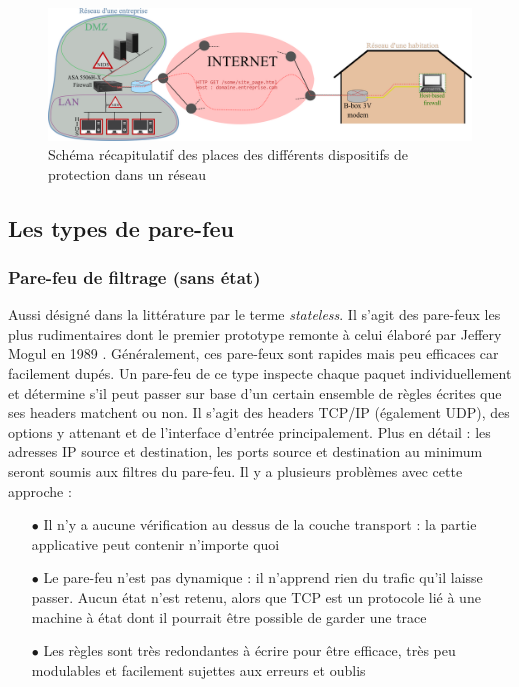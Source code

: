 \documentclass[]{article}
\begin{document}
\begin{figure}[!h]
\centering
\includegraphics[scale=1.65]{netw_IDS.png}
\caption{Schéma récapitulatif des places des différents dispositifs de protection dans un réseau}
\label{netw_IDS}
\end{figure}

\subsection{Les types de pare-feu}

\subsubsection{Pare-feu de filtrage (sans état)}

Aussi désigné dans la littérature par le terme \textit{stateless}. Il s'agit des pare-feux les plus rudimentaires dont le premier prototype remonte à celui élaboré par Jeffery Mogul en 1989 \cite{Shieha2014}. Généralement, ces pare-feux sont rapides mais peu efficaces car facilement dupés. Un pare-feu de ce type inspecte chaque paquet individuellement et détermine s'il peut passer sur base d'un certain ensemble de règles écrites que ses headers matchent ou non. Il s'agit des headers TCP/IP (également UDP), des options y attenant et de l'interface d'entrée principalement. Plus en détail : les adresses IP source et destination, les ports source et destination au minimum seront soumis aux filtres du pare-feu. Il y a plusieurs problèmes avec cette approche :
\vspace{0.2cm}
\begin{itemize}
\item[$\bullet$] Il n'y a aucune vérification au dessus de la couche transport : la partie applicative peut contenir n'importe quoi
\vspace{0.2cm}
\item[$\bullet$] Le pare-feu n'est pas dynamique : il n'apprend rien du trafic qu'il laisse passer. Aucun état n'est retenu, alors que TCP est un protocole lié à une machine à état dont il pourrait être possible de garder une trace
\vspace{0.2cm}
\item[$\bullet$] Les règles sont très redondantes à écrire pour être efficace, très peu modulables et facilement sujettes aux erreurs et oublis
\end{itemize}
\vspace{0.25cm}
\end{document}
